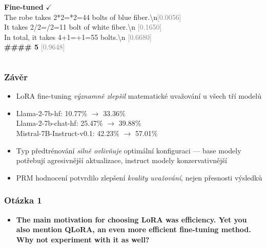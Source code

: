 \begin{frame}
\begin{columns}[T]

\textbf{Fine-tuned} \textcolor{green!60!black}{$\checkmark$}\\[2pt]
{\ttfamily\footnotesize
The robe takes 2*2=\mbox{*2=4\guillemotright}4 bolts of blue fiber.\textbackslash n\textcolor{gray}{[0.0056]}\\
It takes 2/2=\mbox{/2=1\guillemotright}1 bolt of white fiber.\textbackslash n \textcolor{gray}{[0.1650]}\\
In total, it takes 4+1=\mbox{+1=5\guillemotright}5 bolts.\textbackslash n \textcolor{gray}{[0.6680]}\\
\textbf{\#\#\#\# 5} \textcolor{gray}{[0.9648]}}

\end{columns}

\end{frame}





\begin{frame}
  \frametitle{Závěr}

  \begin{itemize}
    \item LoRA fine-tuning \emph{významně zlepšil} matematické uvažování
    u všech tří modelů
    \item[] \small Llama-2-7b-hf: 10.77\% $\to$ \textcolor{green!60!black}{33.36\%} \quad \\
              Llama-2-7b-chat-hf: 25.47\% $\to$ \textcolor{green!60!black}{39.88\%} \quad  \\
              Mistral-7B-Instruct-v0.1: 42.23\% $\to$ \textcolor{green!60!black}{57.01\%} \\
    \normalsize
    \item Typ předtrénování \emph{silně ovlivňuje} optimální konfiguraci
    — base modely potřebují agresivnější aktualizace, instruct modely konzervativnější
    \item PRM hodnocení potvrdilo zlepšení \emph{kvality uvažování},
    nejen přesnosti výsledků
  \end{itemize}

  

\end{frame}


\begin{frame}
\frametitle{Otázka 1}

\begin{itemize}
      \item \textbf{The main motivation for choosing LoRA was efficiency. Yet you also mention QLoRA, an even more efficient fine-tuning method. Why not experiment with it as well?}
  \end{itemize}



\end{frame}

